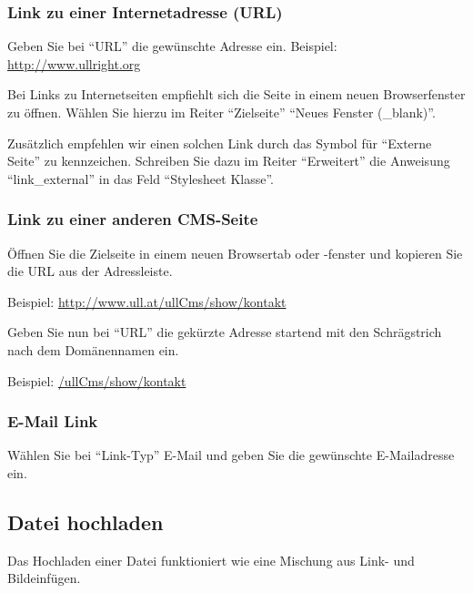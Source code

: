 \documentclass[article, a4paper, oneside, 11pt]{memoir}
\begin{document}
\subsubsection{Link zu einer Internetadresse (URL)}
Geben Sie bei "`URL"' die gewünschte Adresse ein. Beispiel: \url{http://www.ullright.org}

Bei Links zu Internetseiten empfiehlt sich die Seite in einem neuen Browserfenster zu öffnen. Wählen Sie hierzu im Reiter "`Zielseite"' "`Neues Fenster (\_blank)"'.

Zusätzlich empfehlen wir einen solchen Link durch das Symbol für "`Externe Seite"' zu kennzeichen. Schreiben Sie dazu im Reiter "`Erweitert"' die Anweisung "`link\_external"' in das Feld "`Stylesheet Klasse"'.

\subsubsection{Link zu einer anderen CMS-Seite}

Öffnen Sie die Zielseite in einem neuen Browsertab oder -fenster und kopieren Sie die URL aus der Adressleiste.

Beispiel: \url{http://www.ull.at/ullCms/show/kontakt}

Geben Sie nun bei "`URL"' die gekürzte Adresse startend mit den Schrägstrich nach dem Domänennamen ein.

Beispiel: \url{/ullCms/show/kontakt}

\subsubsection{E-Mail Link}

Wählen Sie bei "`Link-Typ"' E-Mail und geben Sie die gewünschte E-Mailadresse ein.



\subsection{Datei hochladen}
\label{sec:upload_file}

Das Hochladen einer Datei funktioniert wie eine Mischung aus Link- und Bildeinfügen.
\end{document}
